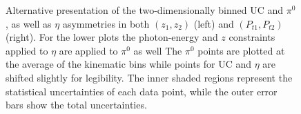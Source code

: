 \begin{figure}[H]
  \centering     
\caption[Alternative presentation of the two-dimensionally binned UC and $\pi^0$, as well as $\eta$ asymmetries in both $(z_1,z_2)$ and $(P_{t1},P_{t2})$]{Alternative presentation of the two-dimensionally binned UC and $\pi^0$, as well as $\eta$ asymmetries in both $(z_1,z_2)$ (left) and $(P_{t1},P_{t2})$ (right). 
For the lower plots the photon-energy and $z$ constraints applied to $\eta$ are applied to $\pi^0$ as well
The $\pi^0$ points are plotted at the average of the kinematic bins while points for UC and $\eta$ are shifted slightly for legibility. 
The inner shaded regions represent the statistical uncertainties of each data point, while the outer error bars show the total uncertainties.}
\label{fig:finalasymmetry4}
\end{figure}

